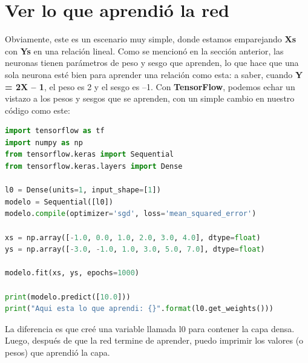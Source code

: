 \section{Ver lo que aprendió la red}

Obviamente, este es un escenario muy simple, donde estamos emparejando \textbf{Xs} con \textbf{Ys} en una relación lineal. Como se mencionó en la sección anterior, las neuronas tienen parámetros de peso y sesgo que aprenden, lo que hace que una sola neurona esté bien para aprender una relación como esta: a saber, cuando \textbf{Y = 2X – 1}, el peso es 2 y el sesgo es –1. Con \textbf{TensorFlow}, podemos echar un vistazo a los pesos y sesgos que se aprenden, con un simple cambio en nuestro código como este:

\begin{lstlisting}[language=python]
import tensorflow as tf
import numpy as np
from tensorflow.keras import Sequential
from tensorflow.keras.layers import Dense

l0 = Dense(units=1, input_shape=[1])
modelo = Sequential([l0])
modelo.compile(optimizer='sgd', loss='mean_squared_error')

xs = np.array([-1.0, 0.0, 1.0, 2.0, 3.0, 4.0], dtype=float)
ys = np.array([-3.0, -1.0, 1.0, 3.0, 5.0, 7.0], dtype=float)

modelo.fit(xs, ys, epochs=1000)

print(modelo.predict([10.0]))
print("Aqui esta lo que aprendi: {}".format(l0.get_weights()))
\end{lstlisting}

La diferencia es que creé una variable llamada l0 para contener la capa densa. Luego, después de que la red termine de aprender, puedo imprimir los valores (o pesos) que aprendió la capa.
